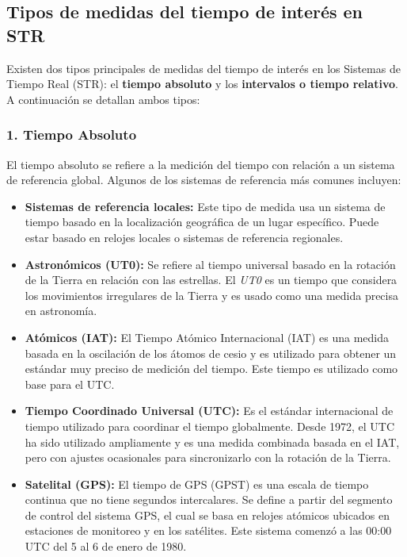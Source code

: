 \documentclass[a4paper,12pt]{article}
\begin{document}
\subsection{Tipos de medidas del tiempo de interés en STR}

Existen dos tipos principales de medidas del tiempo de interés en los Sistemas de Tiempo Real (STR): el \textbf{tiempo absoluto} y los \textbf{intervalos o tiempo relativo}. A continuación se detallan ambos tipos:

\subsubsection{1. Tiempo Absoluto}
El tiempo absoluto se refiere a la medición del tiempo con relación a un sistema de referencia global. Algunos de los sistemas de referencia más comunes incluyen:

\begin{itemize}
    \item \textbf{Sistemas de referencia locales:} Este tipo de medida usa un sistema de tiempo basado en la localización geográfica de un lugar específico. Puede estar basado en relojes locales o sistemas de referencia regionales.
    
    \item \textbf{Astronómicos (UT0):} Se refiere al tiempo universal basado en la rotación de la Tierra en relación con las estrellas. El \textit{UT0} es un tiempo que considera los movimientos irregulares de la Tierra y es usado como una medida precisa en astronomía.
    
    \item \textbf{Atómicos (IAT):} El Tiempo Atómico Internacional (IAT) es una medida basada en la oscilación de los átomos de cesio y es utilizado para obtener un estándar muy preciso de medición del tiempo. Este tiempo es utilizado como base para el UTC.
    
    \item \textbf{Tiempo Coordinado Universal (UTC):} Es el estándar internacional de tiempo utilizado para coordinar el tiempo globalmente. Desde 1972, el UTC ha sido utilizado ampliamente y es una medida combinada basada en el IAT, pero con ajustes ocasionales para sincronizarlo con la rotación de la Tierra.
    
    \item \textbf{Satelital (GPS):} El tiempo de GPS (GPST) es una escala de tiempo continua que no tiene segundos intercalares. Se define a partir del segmento de control del sistema GPS, el cual se basa en relojes atómicos ubicados en estaciones de monitoreo y en los satélites. Este sistema comenzó a las 00:00 UTC del 5 al 6 de enero de 1980.
\end{itemize}
\end{document}
